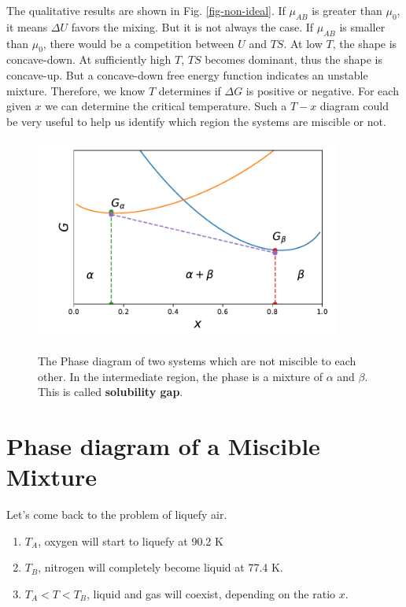 The qualitative results are shown in Fig. \ref{fig-non-ideal}. If $\mu_{AB}$ is greater than $\mu_0$, it means $\Delta{U}$ favors the mixing. But it is not always the case. If $\mu_{AB}$ is smaller than $\mu_0$, there would be a competition between $U$ and $TS$. At low $T$, the shape is concave-down. At sufficiently high $T$, $TS$ becomes dominant, thus the shape is concave-up. But a concave-down free energy function indicates an unstable mixture. Therefore, we know $T$ determines if $\Delta{G}$ is positive or negative. For each given $x$ we can determine the critical temperature. Such a $T-x$ diagram could be very useful to help us identify which region the systems are miscible or not.

\begin{figure}[ht]
\centering
\includegraphics[width=10cm]{imgs/two-solids.pdf}
\label{fig-calc}
\caption{The Phase diagram of two systems which are not miscible to each other. In the intermediate region, the phase is a mixture of $\alpha$ and $\beta$.
This is called \textbf{solubility gap}.}
\end{figure}


\section{Phase diagram of a Miscible Mixture}
Let's come back to the problem of liquefy air. 
\begin{enumerate}
\item $T_A$, oxygen will start to liquefy at 90.2 K 
\item $T_B$, nitrogen will completely become liquid at 77.4 K. 
\item $T_A<T<T_B$, liquid and gas will coexist, depending on the ratio $x$.
\end{enumerate}

